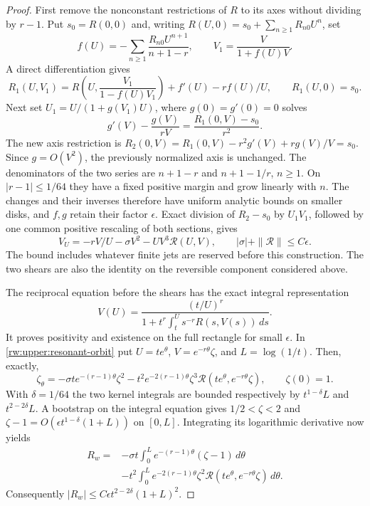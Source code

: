 \begin{proof}
First remove the nonconstant restrictions of $R$ to its axes without
dividing by $r-1$. Put $s_0=R(0,0)$ and, writing
$R(U,0)=s_0+\sum_{n\ge1}R_{n0}U^n$, set
\[
 f(U)=-\sum_{n\ge1}\frac{R_{n0}U^{n+1}}{n+1-r},\qquad
 V_1=\frac V{1+f(U)V}.
\]
A direct differentiation gives
\[
 R_1(U,V_1)=R\left(U,\frac{V_1}{1-f(U)V_1}\right)
                  +f'(U)-rf(U)/U,
 \qquad R_1(U,0)=s_0.
\]
Next set $U_1=U/(1+g(V_1)U)$, where $g(0)=g'(0)=0$ solves
\[
 g'(V)-\frac{g(V)}{rV}=\frac{R_1(0,V)-s_0}{r^2}.
\]
The new axis restriction is
$R_2(0,V)=R_1(0,V)-r^2g'(V)+rg(V)/V=s_0$.
Since $g=O(V^2)$, the previously normalized axis is unchanged.
The denominators of the two series are $n+1-r$ and $n+1-1/r$,
$n\ge1$. On $|r-1|\le1/64$ they have a fixed positive margin and
grow linearly with $n$. The changes and their inverses therefore have
uniform analytic bounds on smaller disks, and $f,g$ retain their factor
$\epsilon$. Exact division of $R_2-s_0$ by $U_1V_1$, followed by one
common positive rescaling of both sections, gives
\begin{equation}\label{rw:upper:resonant-orbit}
 V_U=-rV/U-\sigma V^2-UV^3\mathcal R(U,V),\qquad
 |\sigma|+\|\mathcal R\|\le C\epsilon.
\end{equation}
The bound includes whatever finite jets are reserved before this
construction. The two shears are also the identity on the reversible
component considered above.

The reciprocal equation before the shears has the exact integral
representation
\[
 V(U)=\frac{(t/U)^r}{1+t^r\int_t^U s^{-r}R(s,V(s))\,ds}.
\]
It proves positivity and existence on the full rectangle for small
$\epsilon$. In \eqref{rw:upper:resonant-orbit} put
$U=te^\theta$, $V=e^{-r\theta}\zeta$, and
$L=\log(1/t)$. Then, exactly,
\begin{equation}\label{rw:upper:zeta}
 \zeta_\theta=-\sigma te^{-(r-1)\theta}\zeta^2
 -t^2e^{-2(r-1)\theta}\zeta^3
        \mathcal R(te^\theta,e^{-r\theta}\zeta),\qquad \zeta(0)=1.
\end{equation}
With $\delta=1/64$ the two kernel integrals are bounded respectively by
$t^{1-\delta}L$ and $t^{2-2\delta}L$. A bootstrap on the integral
equation gives $1/2<\zeta<2$ and
$\zeta-1=O(\epsilon t^{1-\delta}(1+L))$ on $[0,L]$.
Integrating its logarithmic derivative now yields
\begin{align*}
 R_w={}&-\sigma t\int_0^L e^{-(r-1)\theta}(\zeta-1)\,d\theta\\
 &-t^2\int_0^L e^{-2(r-1)\theta}\zeta^2
                  \mathcal R(te^\theta,e^{-r\theta}\zeta)\,d\theta.
\end{align*}
Consequently $|R_w|\le C\epsilon t^{2-2\delta}(1+L)^2$.


\end{proof}

